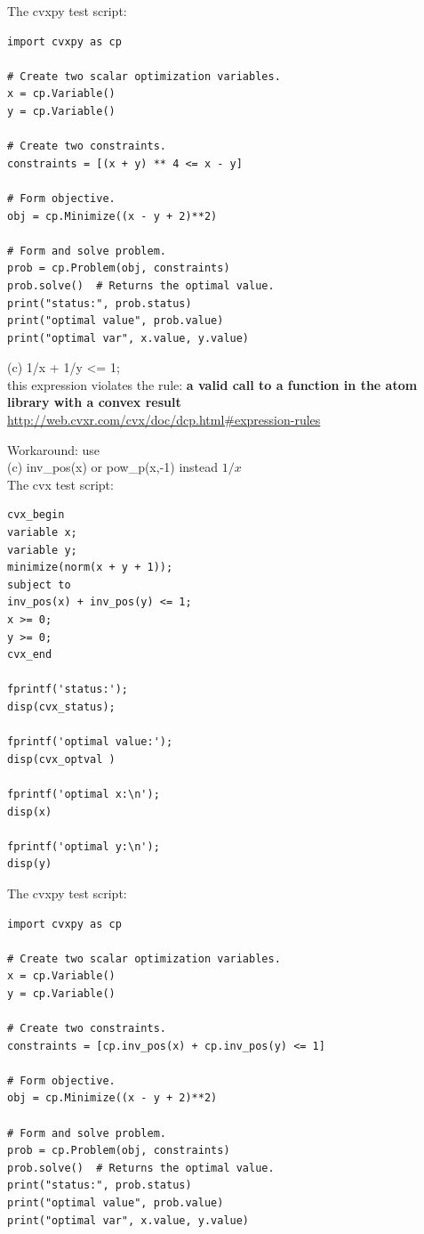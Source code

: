 \documentclass{article}
\begin{document}
The cvxpy test script: \\
\begin{verbatim}
import cvxpy as cp

# Create two scalar optimization variables.
x = cp.Variable()
y = cp.Variable()

# Create two constraints.
constraints = [(x + y) ** 4 <= x - y]

# Form objective.
obj = cp.Minimize((x - y + 2)**2)

# Form and solve problem.
prob = cp.Problem(obj, constraints)
prob.solve()  # Returns the optimal value.
print("status:", prob.status)
print("optimal value", prob.value)
print("optimal var", x.value, y.value)
\end{verbatim}

(c) 1/x + 1/y \textless= 1; \\

this expression violates the rule:
{\bf
a valid call to a function in the atom library with a convex result
} \\
\url{http://web.cvxr.com/cvx/doc/dcp.html#expression-rules}

Workaround: use \\
(c) inv\_pos(x) or pow\_p(x,-1) instead $1/x$ \\

The cvx test script: \\
\begin{verbatim}
cvx_begin
variable x;
variable y;
minimize(norm(x + y + 1));
subject to
inv_pos(x) + inv_pos(y) <= 1; 
x >= 0; 
y >= 0;
cvx_end

fprintf('status:'); 
disp(cvx_status);

fprintf('optimal value:'); 
disp(cvx_optval )

fprintf('optimal x:\n'); 
disp(x)

fprintf('optimal y:\n'); 
disp(y)
\end{verbatim}

The cvxpy test script: \\
\begin{verbatim}
import cvxpy as cp

# Create two scalar optimization variables.
x = cp.Variable()
y = cp.Variable()

# Create two constraints.
constraints = [cp.inv_pos(x) + cp.inv_pos(y) <= 1]

# Form objective.
obj = cp.Minimize((x - y + 2)**2)

# Form and solve problem.
prob = cp.Problem(obj, constraints)
prob.solve()  # Returns the optimal value.
print("status:", prob.status)
print("optimal value", prob.value)
print("optimal var", x.value, y.value)
\end{verbatim}
\end{document}
